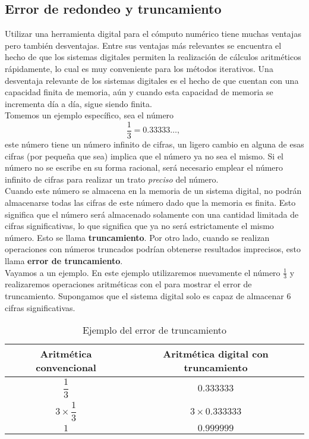 \subsection{Error de redondeo y truncamiento}

Utilizar una herramienta digital para el cómputo numérico tiene muchas ventajas pero también desventajas. Entre sus ventajas más relevantes se encuentra el hecho de que los 
sistemas digitales permiten la realización de cálculos aritméticos rápidamente, lo cual es muy conveniente para los métodos iterativos. Una desventaja relevante de los sistemas
digitales es el hecho de que cuentan con una capacidad finita de memoria, aún y cuando esta capacidad de memoria se incrementa día a día, sigue siendo finita.\\ 

Tomemos un ejemplo específico, sea el número
\[ \dfrac{1}{3} = 0.33333\dots, \ \]
este número tiene un número infinito de cifras, un ligero cambio en alguna de esas cifras (por pequeña que sea) implica que el número ya no sea el mismo. Si el número no se escribe
en su forma racional, será necesario emplear el número infinito de cifras para realizar un trato \textit{preciso} del número. \\

Cuando este número se almacena en la memoria de un sistema digital, no podrán almacenarse todas las cifras de este número dado que la memoria es finita. Esto significa que el número 
será almacenado solamente con una cantidad limitada de cifras significativas, lo que significa que ya no será estrictamente el mismo número. Esto se llama \textbf{truncamiento}.
Por otro lado, cuando se realizan operaciones con números truncados podrían obtenerse resultados imprecisos, esto llama \textbf{error de truncamiento}.\\

Vayamos a un ejemplo. En este ejemplo utilizaremos nuevamente el número $\frac{1}{3}$ y realizaremos operaciones aritméticas con el para mostrar el error de truncamiento. Supongamos
que el sistema digital solo es capaz de almacenar 6 cifras significativas.

\begin{table}
	\centering
	\begin{tabular}{c|c}
	\textbf{Aritmética convencional} & \textbf{Aritmética digital con truncamiento}\\
	\hline
	$\dfrac{1}{3}$ & $0.333333$\\
	$3\times\dfrac{1}{3}$ & $3\times 0.333333$\\
	$1$ & $0.999999$		
	\end{tabular}
	\caption{Ejemplo del error de truncamiento}
	\label{table:errorTruncamiento}
\end{table}

